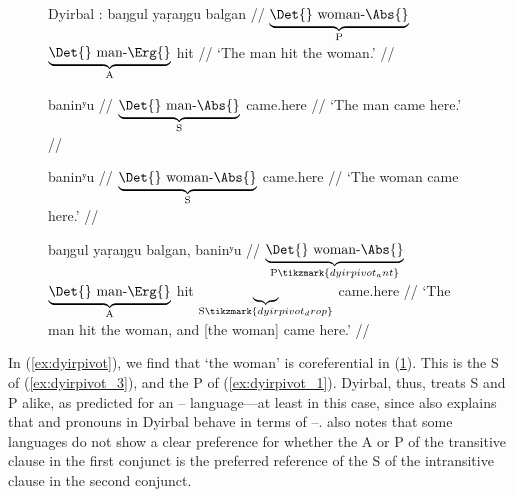 \begin{figure}
\pex\label{ex:dyirpivot}%
Dyirbal \parencite[adapted from][112]{comrie1989}:
\a\label{ex:dyirpivot_1}
	\begingl
		 {baŋgul yaṛaŋgu} balgan //
		\glb $\underbrace{\text{\Det{} woman-\Abs{}}}_{\text{P}}$
			$\underbrace{\text{\Det{} man-\Erg{}}}_{\text{A}}$ hit //
		\glft `The man hit the woman.' //
	\endgl
	
\a\label{ex:dyirpivot_2}%
	\begingl
		 baninʸu //
		\glb $\underbrace{\text{\Det{} man-\Abs{}}}_{\text{S}}$ came.here //
		\glft `The man came here.' //
	\endgl
	
\a\label{ex:dyirpivot_3}%
	\begingl
		 baninʸu //
		\glb $\underbrace{\text{\Det{} woman-\Abs{}}}_{\text{S}}$ 
			came.here //
		\glft `The woman came here.' //
	\endgl
	
\a\label{ex:dyirpivot_4}%
	\begingl[aboveglftskip=1.75em]
		 {baŋgul yaṛaŋgu} balgan, {} baninʸu //
		\glb $\underbrace{\text{\Det{} woman-\Abs{}}}_%
				{\text{P}\tikzmark{dyirpivot_ant}}$
			$\underbrace{\text{\Det{} man-\Erg{}}}_{\text{A}}$
			hit 
			$\underbrace{ }_{\text{S}\tikzmark{dyirpivot_drop}}$
			came.here //
		\glft `The man hit the woman, and [the woman] came here.' //
	\endgl

\xe
\end{figure}

In (\ref{ex:dyirpivot}), we find that  `the woman' is
coreferential in (\ref{ex:dyirpivot_4}). This is the S of
(\ref{ex:dyirpivot_3}), and the P of (\ref{ex:dyirpivot_1}). Dyirbal, thus,
treats S and P alike, as predicted for an \Erg{}--\Abs{} language---at least in
this case, since \citet[113]{comrie1989} also explains that \Fsg{} and \Ssg{}
pronouns in Dyirbal behave in terms of \Nom{}--\Acc{}. \citet{comrie1989} also
notes that some languages do not show a clear preference for whether the A or P
of the transitive clause in the first conjunct is the preferred reference of
the S of the intransitive clause in the second conjunct.

